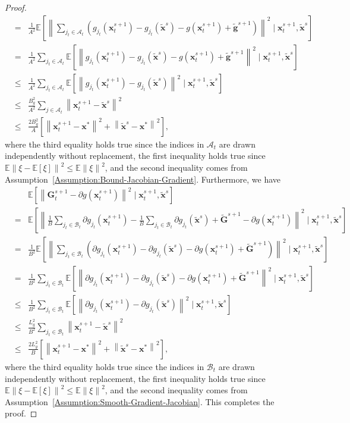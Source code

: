 \documentclass[11pt]{article}
\newcommand{\BE}{\mathbb{E}}
\newcommand{\x}{\mathbf x}
\newcommand{\g}{\mathbf g}
\newcommand{\G}{\mathbf G}
\newcommand{\ACal}{\mathcal{A}}
\newcommand{\BCal}{\mathcal{B}}
\begin{document}
\begin{proof}
\begin{eqnarray*}
& = & \frac{1}{A^2}\BE\left[\left\| \sum_{j_t\in\ACal_t} \left(g_{j_t}(\x_t^{s+1}) - g_{j_t}(\tilde{\x}^s) - g(\x_t^{s+1}) + \tilde{\g}^{s+1} \right)\right\|^2 \mid \x_t^{s+1}, \tilde{\x}^s\right] \\
& = & \frac{1}{A^2}\sum_{j_t\in\ACal_t} \BE\left[\left\| g_{j_t}(\x_t^{s+1}) - g_{j_t}(\tilde{\x}^s) - g(\x_t^{s+1}) + \tilde{\g}^{s+1} \right\|^2 \mid \x_t^{s+1}, \tilde{\x}^s\right] \\
& \leq & \frac{1}{A^2}\sum_{j_t\in\ACal_t} \BE\left[\left\| g_{j_t}(\x_t^{s+1}) - g_{j_t}(\tilde{\x}^s) \right\|^2 \mid \x_t^{s+1}, \tilde{\x}^s\right] \\
& \leq & \frac{B_g^2}{A^2}\sum_{j\in\ACal_t} \left\| \x_t^{s+1} - \tilde{\x}^s \right\|^2 \\
& \leq & \frac{2B_g^2}{A}\left[\left\| \x_t^{s+1} - \x^*\right\|^2 + \left\|\tilde{\x}^s - \x^*\right\|^2 \right], 
\end{eqnarray*}
where the third equality holds true since the indices in $\ACal_t$ are drawn independently without replacement, the first inequality holds true since $\BE\left\|\xi-\BE\left[\xi\right]\right\|^2 \leq \BE\left\|\xi\right\|^2$, and the second inequality comes from Assumption~\ref{Assumption:Bound-Jacobian-Gradient}. Furthermore, we have
\begin{eqnarray*}
& & \BE\left[\left\| \G_t^{s+1} - \partial g(\x_t^{s+1})\right\|^2 \mid \x_t^{s+1}, \tilde{\x}^s\right] \\
& = & \BE\left[\left\| \frac{1}{B}\sum_{j_t\in\BCal_t} \partial g_{j_t}(\x_t^{s+1}) - \frac{1}{B}\sum_{j_t\in\BCal_t} \partial g_{j_t}(\tilde{\x}^s) + \tilde{\G}^{s+1} - \partial g(\x_t^{s+1})\right\|^2 \mid \x_t^{s+1}, \tilde{\x}^s\right] \\
& = & \frac{1}{B^2}\BE\left[\left\| \sum_{j_t\in\BCal_t} \left(\partial g_{j_t}(\x_t^{s+1}) - \partial g_{j_t}(\tilde{\x}^s) - \partial g(\x_t^{s+1}) + \tilde{\G}^{s+1} \right)\right\|^2 \mid \x_t^{s+1}, \tilde{\x}^s\right] \nonumber \\
& = & \frac{1}{B^2}\sum_{j_t\in\BCal_t} \BE\left[\left\| \partial g_{j_t}(\x_t^{s+1}) - \partial g_{j_t}(\tilde{\x}^s) - \partial g(\x_t^{s+1}) + \tilde{\G}^{s+1} \right\|^2 \mid \x_t^{s+1}, \tilde{\x}^s\right] \nonumber \\
& \leq & \frac{1}{B^2}\sum_{j_t\in\BCal_t} \BE\left[\left\| \partial g_{j_t}(\x_t^{s+1}) - \partial g_{j_t}(\tilde{\x}^s) \right\|^2 \mid \x_t^{s+1}, \tilde{\x}^s\right] \nonumber \\
& \leq & \frac{L_g^2}{B^2}\sum_{j_t\in\BCal_t} \left\| \x_t^{s+1} - \tilde{\x}^s \right\|^2 \nonumber \\
& \leq & \frac{2L_g^2}{B}\left[\left\| \x_t^{s+1} - \x^*\right\|^2 + \left\|\tilde{\x}^s - \x^*\right\|^2 \right],
\end{eqnarray*}
where the third equality holds true since the indices in $\BCal_t$ are drawn independently without replacement, the first inequality holds true since $\BE\left\|\xi-\BE\left[\xi\right]\right\|^2 \leq \BE\left\|\xi\right\|^2$, and the second inequality comes from Assumption~\ref{Assumption:Smooth-Gradient-Jacobian}. This completes the proof. 
\end{proof}
\end{document}
